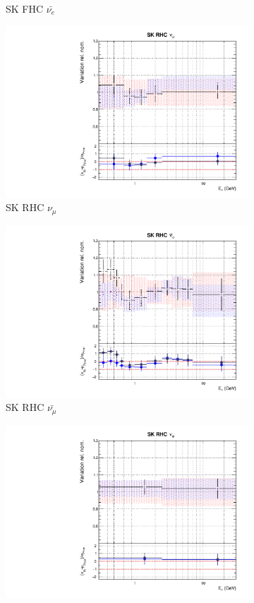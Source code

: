 \begin{figure}[t]
\begin{subfigure}{0.42\textwidth}
  \caption{SK FHC $\bar{\nu_{e}}$}
\end{subfigure}
\begin{subfigure}{0.42\textwidth}
  \centering
  \includegraphics[width=0.75\linewidth]{figs/rhcmpdat28flux_12}
  \caption{SK RHC $\nu_{\mu}$}
\end{subfigure}
\begin{subfigure}{0.42\textwidth}
  \centering
  \includegraphics[width=0.75\linewidth]{figs/rhcmpdat28flux_13}
  \caption{SK RHC $\bar{\nu_{\mu}}$}
\end{subfigure}
\begin{subfigure}{0.42\textwidth}
  \centering
  \includegraphics[width=0.75\linewidth]{figs/rhcmpdat28flux_14}

\end{subfigure}
\end{figure}
